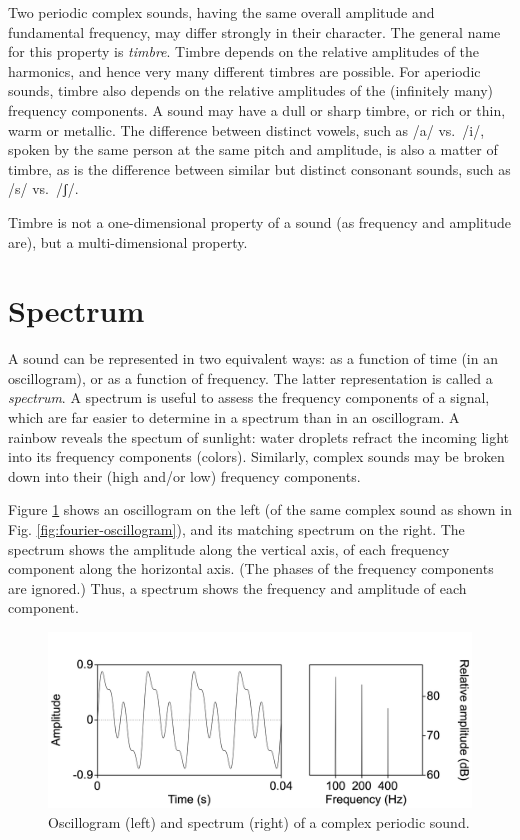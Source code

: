\documentclass[
]{book}
\begin{document}
Two periodic complex sounds, having the same overall amplitude and fundamental frequency, may differ strongly in their character.
The general name for this property is \emph{timbre}.
Timbre depends on the relative amplitudes of the harmonics, and hence very many different timbres are possible.
For aperiodic sounds, timbre also depends on the relative amplitudes of the (infinitely many) frequency components.
A sound may have a dull or sharp timbre, or rich or thin, warm or metallic. The difference between distinct vowels, such as /a/ vs.~/i/, spoken by the same person at the same pitch and amplitude, is also a matter of timbre, as is the difference between similar but distinct consonant sounds, such as /s/ vs.~/ʃ/.

Timbre is not a one-dimensional property of a sound (as frequency and amplitude are), but a multi-dimensional property.

\section{Spectrum}\label{sec:spectrum}

A sound can be represented in two equivalent ways: as a function of time (in an oscillogram), or as a function of frequency. The latter representation is called a \emph{spectrum}. A spectrum is useful to assess the frequency components of a signal, which are far easier to determine in a spectrum than in an oscillogram. A rainbow reveals the spectum of sunlight: water droplets refract the incoming light into its frequency components (colors). Similarly, complex sounds may be broken down into their (high and/or low) frequency components.

Figure \ref{fig:complex100n200n400} shows an oscillogram on the left (of the same complex sound as shown in Fig. \ref{fig:fourier-oscillogram}), and its matching spectrum on the right. The spectrum shows the amplitude along the vertical axis, of each frequency component along the horizontal axis. (The phases of the frequency components are ignored.) Thus, a spectrum shows the frequency and amplitude of each component.

\begin{figure}

{\centering \includegraphics{figures/complex100n200n400} 

}

\caption{Oscillogram (left) and spectrum (right) of a complex periodic sound.}\label{fig:complex100n200n400}
\end{figure}
\end{document}
